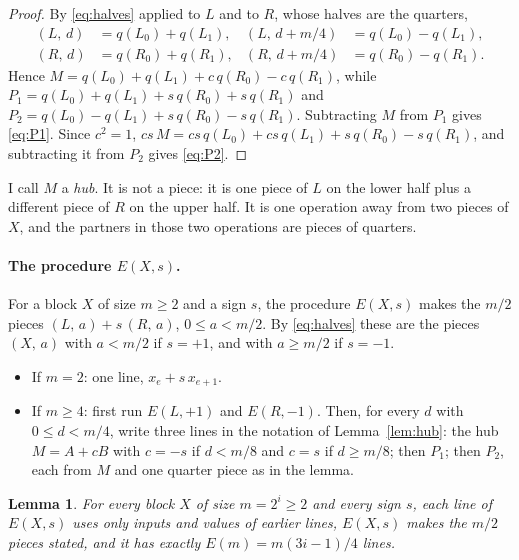 \documentclass[10pt]{article}
\newtheorem{lemma}[proposition]{Lemma}
\theoremstyle{remark}
\newcommand{\pc}[2]{(#1,\,#2)}
\begin{document}
\begin{proof}
By \eqref{eq:halves} applied to $L$ and to $R$, whose halves are the quarters,
\[
\begin{aligned}
\pc Ld&=q(L_0)+q(L_1), & \pc L{d+m/4}&=q(L_0)-q(L_1),\\
\pc Rd&=q(R_0)+q(R_1), & \pc R{d+m/4}&=q(R_0)-q(R_1).
\end{aligned}
\]
Hence $M=q(L_0)+q(L_1)+c\,q(R_0)-c\,q(R_1)$, while $P_1=q(L_0)+q(L_1)+s\,q(R_0)+s\,q(R_1)$ and
$P_2=q(L_0)-q(L_1)+s\,q(R_0)-s\,q(R_1)$. Subtracting $M$ from $P_1$ gives \eqref{eq:P1}. Since $c^2=1$,
$cs\,M=cs\,q(L_0)+cs\,q(L_1)+s\,q(R_0)-s\,q(R_1)$, and subtracting it from $P_2$ gives \eqref{eq:P2}.
\end{proof}

I call $M$ a \emph{hub}. It is not a piece: it is one piece of $L$ on the lower half plus a different piece
of $R$ on the upper half. It is one operation away from two pieces of $X$, and the partners in those two
operations are pieces of quarters.

\paragraph{The procedure $E(X,s)$.}
For a block $X$ of size $m\ge2$ and a sign $s$, the procedure $E(X,s)$ makes the $m/2$ pieces
$\pc La+s\,\pc Ra$, $0\le a<m/2$. By \eqref{eq:halves} these are the pieces $\pc Xa$ with $a<m/2$ if $s=+1$,
and with $a\ge m/2$ if $s=-1$.
\begin{itemize}\setlength{\itemsep}{1pt}\setlength{\parskip}{0pt}
\item If $m=2$: one line, $x_e+s\,x_{e+1}$.
\item If $m\ge4$: first run $E(L,+1)$ and $E(R,-1)$. Then, for every $d$ with $0\le d<m/4$, write three lines
in the notation of Lemma~\ref{lem:hub}: the hub $M=A+cB$ with $c=-s$ if $d<m/8$ and $c=s$ if $d\ge m/8$;
then $P_1$; then $P_2$, each from $M$ and one quarter piece as in the lemma.
\end{itemize}

\begin{lemma}\label{lem:E}
For every block $X$ of size $m=2^i\ge2$ and every sign $s$, each line of $E(X,s)$ uses only inputs and
values of earlier lines, $E(X,s)$ makes the $m/2$ pieces stated, and it has exactly $E(m)=m(3i-1)/4$ lines.
\end{lemma}
\end{document}
